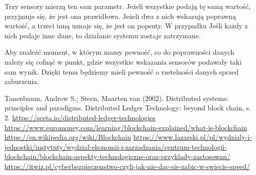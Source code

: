 \documentclass[12pt]{article}
\begin{document}
Trzy sensory mierzą ten sam parametr. Jeżeli wszystkie podają tę samą wartość, przyjmuje się, że jest ona prawidłowa. Jeżeli dwa z nich wskazują poprawną wartość, a trzeci inną uznaje się, że jest on popsuty. W przypadku Jeśli każdy z nich podaje inne dane, to działanie systemu zostaje zatrzymane.

Aby znależć moment, w którym mamy pewność, co do poprawności danych należy się cofnąć w punkt, gdzie wszystkie wskazania sensorów podawały taki sam wynik. Dzięki temu będziemy mieli pewność o rzetelności danych sprzed zaburzenia.

\begin{thebibliography}{9}
  Tanenbaum, Andrew S.; Steen, Maarten van (2002). Distributed systems: principles and paradigms.
  Distributed Ledger Technology: beyond block chain, s. 2.
  \url{https://sceta.io/distributed-ledger-technologies}
  \url{https://www.euromoney.com/learning/blockchain-explained/what-is-blockchain}
  \url{https://en.wikipedia.org/wiki/Blockchain}
  \url{https://www.lazarski.pl/pl/wydzialy-i-jednostki/instytuty/wydzial-ekonomii-i-zarzadzania/centrum-technologii-blockchain/blockchain-aspekty-technologiczne-oraz-przyklady-zastosowan/}
  \url{https://itwiz.pl/cyberbezpieczenstwo-czyli-jak-nie-dac-sie-zabic-w-swiecie-speed/}
\end{thebibliography}
\end{document}
